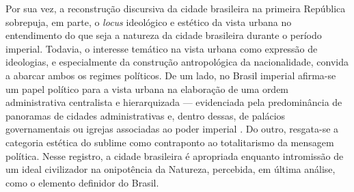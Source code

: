 Por sua vez, a reconstrução discursiva da cidade brasileira na primeira
República sobrepuja, em parte, o \emph{locus} ideológico e estético da
vista urbana no entendimento do que seja a natureza da cidade brasileira
durante o período imperial. Todavia, o interesse temático na vista
urbana como expressão de ideologias, e especialmente da construção
antropológica da nacionalidade, convida a abarcar ambos os regimes
políticos. De um lado, no Brasil imperial afirma-se um papel político
para a vista urbana na elaboração de uma ordem administrativa
centralista e hierarquizada --- evidenciada pela predominância de
panoramas de cidades administrativas e, dentro dessas, de palácios
governamentais ou igrejas associadas ao poder imperial
\autocite{barata:1996alguns}. Do outro, resgata-se a categoria estética
do sublime \autocite{naxara:2004cientificismo} como contraponto ao
totalitarismo da mensagem política. Nesse registro, a cidade brasileira
é apropriada enquanto intromissão de um ideal civilizador na onipotência
da Natureza, percebida, em última análise, como o elemento definidor do
Brasil.

